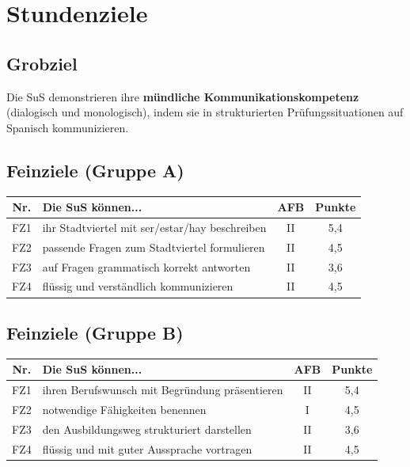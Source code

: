\documentclass[11pt,a4paper]{article}
\begin{document}
\section{Stundenziele}

\subsection{Grobziel}
Die SuS demonstrieren ihre \textbf{mündliche Kommunikationskompetenz} (dialogisch und monologisch), indem sie in strukturierten Prüfungssituationen auf Spanisch kommunizieren.

\subsection{Feinziele (Gruppe A)}
\begin{tabular}{|c|p{7cm}|c|c|}
\hline
\textbf{Nr.} & \textbf{Die SuS können...} & \textbf{AFB} & \textbf{Punkte} \\
\hline
FZ1 & ihr Stadtviertel mit ser/estar/hay beschreiben & II & 5,4 \\
\hline
FZ2 & passende Fragen zum Stadtviertel formulieren & II & 4,5 \\
\hline
FZ3 & auf Fragen grammatisch korrekt antworten & II & 3,6 \\
\hline
FZ4 & flüssig und verständlich kommunizieren & II & 4,5 \\
\hline
\end{tabular}

\subsection{Feinziele (Gruppe B)}
\begin{tabular}{|c|p{7cm}|c|c|}
\hline
\textbf{Nr.} & \textbf{Die SuS können...} & \textbf{AFB} & \textbf{Punkte} \\
\hline
FZ1 & ihren Berufswunsch mit Begründung präsentieren & II & 5,4 \\
\hline
FZ2 & notwendige Fähigkeiten benennen & I & 4,5 \\
\hline
FZ3 & den Ausbildungsweg strukturiert darstellen & II & 3,6 \\
\hline
FZ4 & flüssig und mit guter Aussprache vortragen & II & 4,5 \\
\hline
\end{tabular}
\end{document}
